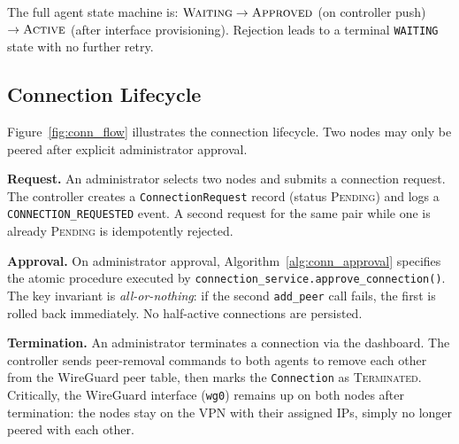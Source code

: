 \documentclass[conference]{IEEEtran}
\begin{document}
The full agent state machine is:
$\textsc{Waiting} \rightarrow \textsc{Approved}$ (on controller push)
$\rightarrow \textsc{Active}$ (after interface provisioning).
Rejection leads to a terminal \texttt{WAITING} state with no further retry.

\subsection{Connection Lifecycle}

Figure~\ref{fig:conn_flow} illustrates the connection lifecycle. Two nodes may
only be peered after explicit administrator approval.

\textbf{Request.} An administrator selects two nodes and submits a connection
request.  The controller creates a \texttt{ConnectionRequest} record (status
\textsc{Pending}) and logs a \texttt{CONNECTION\_REQUESTED} event. A second request
for the same pair while one is already \textsc{Pending} is idempotently rejected.

\textbf{Approval.} On administrator approval, Algorithm~\ref{alg:conn_approval}
specifies the atomic procedure executed by
\texttt{connection\_service.approve\_connection()}. The key invariant is
\emph{all-or-nothing}: if the second \texttt{add\_peer} call fails, the first is
rolled back immediately. No half-active connections are persisted.

\textbf{Termination.} An administrator terminates a connection via the dashboard.
The controller sends peer-removal commands to both agents to remove each other from
the WireGuard peer table, then marks the \texttt{Connection} as
\textsc{Terminated}.  Critically, the WireGuard interface (\texttt{wg0}) remains
up on both nodes after termination: the nodes stay on the VPN with their assigned
IPs, simply no longer peered with each other.
\end{document}
